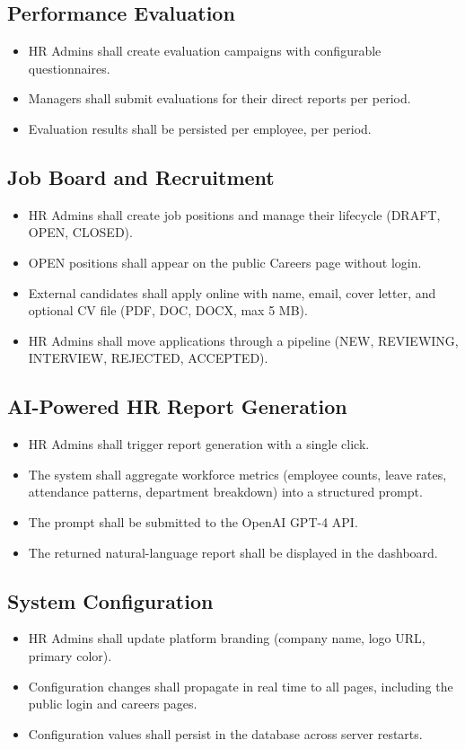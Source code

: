 \documentclass[12pt,a4paper]{report}
\begin{document}
\subsection{Performance Evaluation}
\begin{itemize}
  \item HR Admins shall create evaluation campaigns with configurable questionnaires.
  \item Managers shall submit evaluations for their direct reports per period.
  \item Evaluation results shall be persisted per employee, per period.
\end{itemize}

\subsection{Job Board and Recruitment}
\begin{itemize}
  \item HR Admins shall create job positions and manage their lifecycle
    (DRAFT, OPEN, CLOSED).
  \item OPEN positions shall appear on the public Careers page without login.
  \item External candidates shall apply online with name, email, cover letter,
    and optional CV file (PDF, DOC, DOCX, max 5 MB).
  \item HR Admins shall move applications through a pipeline
    (NEW, REVIEWING, INTERVIEW, REJECTED, ACCEPTED).
\end{itemize}

\subsection{AI-Powered HR Report Generation}
\begin{itemize}
  \item HR Admins shall trigger report generation with a single click.
  \item The system shall aggregate workforce metrics (employee counts, leave rates,
    attendance patterns, department breakdown) into a structured prompt.
  \item The prompt shall be submitted to the OpenAI GPT-4 API.
  \item The returned natural-language report shall be displayed in the dashboard.
\end{itemize}

\subsection{System Configuration}
\begin{itemize}
  \item HR Admins shall update platform branding (company name, logo URL, primary color).
  \item Configuration changes shall propagate in real time to all pages, including
    the public login and careers pages.
  \item Configuration values shall persist in the database across server restarts.
\end{itemize}
\end{document}
